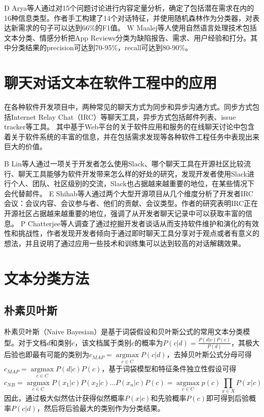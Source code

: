 D Arya等人\cite{arya2019analysis}通过对15个问题讨论进行内容定量分析，确定了包括潜在需求在内的16种信息类型。作者手工构建了14个对话特征，并使用随机森林作为分类器，对表达新需求的句子可以达到66\%的F1值。
W Maalej等人\cite{maalej2015bug}使用自然语言处理技术包括文本分类、情感分析把App Reviews分类为缺陷报告、需求、用户经验和打分。其中分类结果的precision可达到70-95\%，recall可达到80-90\%。

\section{聊天对话文本在软件工程中的应用}
在各种软件开发项目中，两种常见的聊天方式为同步和异步沟通方式\cite{yu2011communications}。同步方式包括Internet Relay Chat（IRC）等聊天工具，异步方式包括邮件列表、issue tracker等工具。
其中基于Web平台的关于软件应用和服务的在线聊天讨论中包含着关于软件系统的丰富的信息，并在包括需求发现等各种软件工程任务中表现出来巨大的价值\cite{Morales2019Speech}。

B Lin等人\cite{lin2016developers}通过一项关于开发者怎么使用Slack、哪个聊天工具在开源社区比较流行、聊天工具能够为软件开发带来怎么样的好处的研究，发现开发者使用Slack进行个人、团队、社区级别的交流，Slack也占据越来越重要的地位，在某些情况下会代替邮件。
E Shihab等人\cite{shihab2009studying}通过两个大型开源项目从几个维度分析了开发者IRC会议：会议内容、会议参与者、他们的贡献、会议类型。作者的研究表明IRC正在开源社区占据越来越重要的地位，强调了从开发者聊天记录中可以获取丰富的信息。
P Chatterjee等人\cite{chatterjee2019exploratory}调查了通过挖掘开发者谈话从而支持软件维护和演化的有效性和挑战性，作者发现开发者倾向于通过即时聊天工具分享对于观点或者有意义的想法，并且说明了通过应用一些技术和训练集可以达到较高的对话解耦效果。



\section{文本分类方法}
\subsection{朴素贝叶斯}
朴素贝叶斯（Naive Bayesian）\cite{mccallum1998comparison}是基于词袋假设和贝叶斯公式的常用文本分类模型。对于文档$d$和类别$c$，该文档属于类别$c$的概率为$P(c|d)=\frac{P(d|c)P(c)}{P(d)}$，其极大后验也即最有可能的类别为$c_{MAP}=\mathop{\arg\max}\limits_{c \in C}P(c|d)$，去掉贝叶斯公式分母可得$c_{MAP}=\mathop{\arg\max}\limits_{c \in C}P(d|c)P(c)$，基于词袋模型和特征条件独立性假设可得
$$c_{NB}=\mathop{\arg\max}\limits_{c \in C}P(x_1|c)P(x_2|c)\dots P(x_n|c)P(c)=\mathop{\arg\max}\limits_{c \in C}p(c)\prod\limits_{x \in X}P(x|c)$$
因此，通过极大似然估计获得似然概率$P(x|c)$和先验概率$P(c)$即可得到后验概率$P(c|d)$，然后将后验最大的类别作为分类结果。

